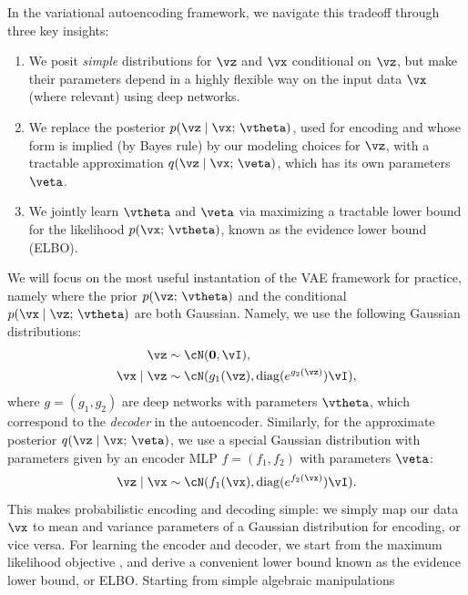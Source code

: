 \documentclass[../../book-main.tex]{subfiles}
\begin{document}
In the variational autoencoding framework, we navigate this tradeoff through
three key insights:
\begin{enumerate}
\item We posit \textit{simple} distributions for $\vz$ and $\vx$ conditional
  on $\vz$, but make their parameters depend in a highly flexible way on the
  input data $\vx$ (where relevant) using deep networks.
\item We replace the posterior $p(\vz \mid \vx;\, \vtheta)$, used for encoding
  and whose form is implied (by Bayes rule) by our modeling choices for $\vz$,
  with a tractable approximation $q(\vz \mid \vx;\, \veta)$, which has its own
  parameters $\veta$.
\item We jointly learn $\vtheta$ and $\veta$ via maximizing a tractable lower
  bound for the likelihood $p(\vx ;\, \vtheta)$, known as the evidence lower
  bound (ELBO).
\end{enumerate}
We will focus on the most useful instantation of the VAE framework
for practice, namely
where the prior $p(\vz ;\, \vtheta)$ and the conditional $p(\vx \mid \vz;\,
\vtheta)$ are both Gaussian. Namely, we use the following Gaussian
distributions:
\begin{align*}
\vz &\sim \cN(\Zero, \vI), \\
\vx \mid \vz &\sim \cN(g_1(\vz), \diag(e^{g_2(\vz)}) \vI),
\end{align*}
where $g = (g_1, g_2)$ are deep networks with parameters $\vtheta$, which
correspond to the \textit{decoder} in the autoencoder.
Similarly, for the approximate posterior $q(\vz \mid \vx;\, \veta)$, we use
a special Gaussian distribution with parameters given by an encoder
MLP $f = (f_1, f_2)$ with parameters $\veta$:
\begin{equation*}
\vz \mid \vx \sim \cN(f_1(\vx), \diag(e^{f_2(\vx)}) \vI).
\end{equation*}
This makes probabilistic encoding and decoding simple: we simply map our data
$\vx$ to mean and variance parameters of a Gaussian distribution for
encoding, or vice versa.
For learning the encoder and decoder, we start from the maximum likelihood
objective , and derive a convenient lower bound known as the
evidence lower bound, or ELBO. Starting from simple algebraic manipulations
\end{document}
